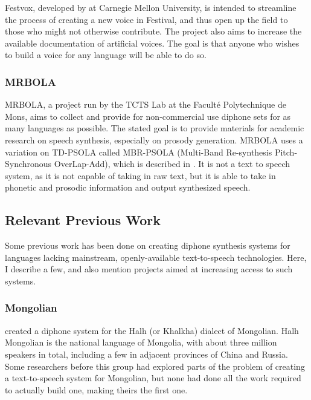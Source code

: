 \documentclass[12pt]{article}
\begin{document}
		Festvox, developed by \citet{festvox} at Carnegie Mellon University, is intended to streamline the process of creating a new voice in Festival, and thus open up the field to those who might not otherwise contribute. The project also aims to increase the available documentation of artificial voices. The goal is that anyone who wishes to build a voice for any language will be able to do so. \par

		\subsubsection{MRBOLA}
		MRBOLA, a project run by the TCTS Lab at the Facult\'e Polytechnique de Mons, aims to collect and provide for non-commercial use diphone sets for as many languages as possible. The stated goal is to provide materials for academic research on speech synthesis, especially on prosody generation. MRBOLA uses a variation on TD-PSOLA called MBR-PSOLA (Multi-Band Re-synthesis Pitch-Synchronous OverLap-Add), which is described in \citet{four_cand}. It is not a text to speech system, as it is not capable of taking in raw text, but it is able to take in phonetic and prosodic information and output synthesized speech. \par

	\subsection{Relevant Previous Work}

		Some previous work has been done on creating diphone synthesis systems for languages lacking mainstream, openly-available text-to-speech technologies. Here, I describe a few, and also mention projects aimed at increasing access to such systems. \par

		\subsubsection{Mongolian}

		\citet{mongolian} created a diphone system for the Halh (or Khalkha) dialect of Mongolian. Halh Mongolian is the national language of Mongolia, with about three million speakers in total, including a few in adjacent provinces of China and Russia. Some researchers before this group had explored parts of the problem of creating a text-to-speech system for Mongolian, but none had done all the work required to actually build one, making theirs the first one. \par
\end{document}
